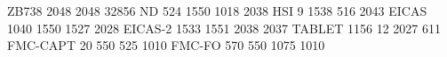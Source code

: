 ZB738 2048 2048 32856
ND        524 1550 1018 2038
HSI         9 1538  516 2043
EICAS    1040 1550 1527 2028
EICAS-2  1533 1551 2038 2037
TABLET   1156   12 2027  611
FMC-CAPT   20  550  525 1010    
FMC-FO    570  550 1075 1010
